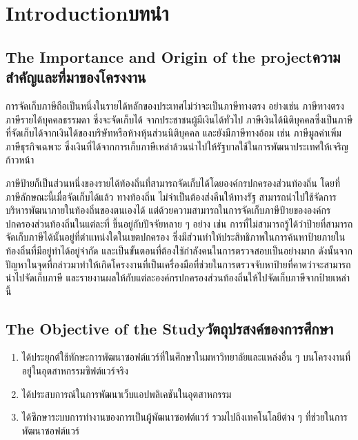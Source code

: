 \chapter{\ifenglish Introduction\else บทนำ\fi}

\section{\ifenglish The Importance and Origin of the 
project\else ความสำคัญและที่มาของโครงงาน\fi}

การจัดเก็บภาษีถือเป็นหนึ่งในรายได้หลักของประเทศไม่ว่าจะเป็นภาษีทางตรง อย่างเช่น ภาษีทางตรง ภาษีรายได้บุคคลธรรมดา ซึ่งจะจัดเก็บได้
จากประชาชนผู้มีเงินได้ทั่วไป ภาษีเงินได้นิติบุคคลซึ่งเป็นภาษีที่จัดเก็บได้จากเงินได้ของบริษัทหรือห้างหุ้นส่วนนิติบุคคล และยังมีภาษีทางอ้อม เช่น 
ภาษีมูลค่าเพิ่ม ภาษีธุรกิจเฉพาะ ซึ่งเงินที่ได้จากการเก็บภาษีเหล่าล้วนนำไปให้รัฐบาลใช้ในการพัฒนาประเทศให้เจริญก้าวหน้า  

ภาษีป้ายก็เป็นส่วนหนึ่งของรายได้ท้องถิ่นที่สามารถจัดเก็บได้โดยองค์กรปกครองส่วนท้องถิ่น โดยที่ภาษีลักษณะนี้เมื่อจัดเก็บได้แล้ว ทางท้องถิ่น
ไม่จำเป็นต้องส่งคืนให้ทางรัฐ สามารถนำไปใช้จัดการบริหารพัฒนาภายในท้องถิ่นของตนเองได้ 
แต่ด้วยความสามารถในการจัดเก็บภาษีป้ายขององค์กรปกครองส่วนท้องถิ่นในแต่ละที่ ขึ้นอยู่กับปัจจัยหลาย ๆ อย่าง เช่น 
การที่ไม่สามารถรู้ได้ว่าป้ายที่สามารถจัดเก็บภาษีได้นั้นอยู่ที่ตำแหน่งใดในเขตปกครอง ซึ่งมีส่วนทำให้ประสิทธิภาพในการค้นหาป้ายภายในท้องถิ่นที่มีอยู่ทำได้อยู่จำกัด
และเป็นขั้นตอนที่ต้องใช้กำลังคนในการตรวจสอบเป็นอย่างมาก 
ดังนั้นจากปัญหาในจุดที่กล่าวมาทำให้เกิดโครงงานที่เป็นเครื่องมือที่ช่วยในการตรวจจับหาป้ายที่คาดว่าจะสามารถนำไปจัดเก็บภาษี 
และรายงานผลให้กับแต่ละองค์กรปกครองส่วนท้องถิ่นให้ไปจัดเก็บภาษีจากป้ายเหล่านี้

\section{\ifenglish The Objective of the Study\else วัตถุปรสงค์ของการศึกษา\fi}
\begin{enumerate}
    \item ได้ประยุกต์ใช้ทักษะการพัฒนาซอฟต์แวร์ที่ในศึกษาในมหาวิทยาลัยและแหล่งอื่น ๆ บนโครงงานที่อยู่ในอุตสาหกรรมซิฟต์แวร์จริง
    \item ได้ประสบการณ์ในการพัฒนาเว็บแอปพลิเคชันในอุตสาหกรรม
    \item ได้ซึกษาระบบการทำงานของการเป็นผู้พัฒนาซอฟต์แวร์ รวมไปถึงเทคโนโลยีต่าง ๆ ที่ช่วยในการพัฒนาซอฟต์แวร์
\end{enumerate}